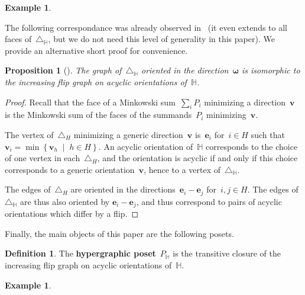 \documentclass[reqno]{amsart}
\newtheorem{proposition}[theorem]{Proposition}
\theoremstyle{definition}
\newtheorem{definition}[theorem]{Definition}
\newtheorem{example}[theorem]{Example}
\renewcommand{\b}[1]{\boldsymbol{#1}} %
\newcommand{\set}[2]{\left\{ #1 \;\middle|\; #2 \right\}} %
\newcommand{\simplex}{\triangle} %
\newcommand{\defn}[1]{\textbf{\textsf{\color{PineGreen} #1}}} %
\newcommand{\vincent}[1]{\todo[size=\tiny,color=blue!30]{ #1 \\ \hfill --- V.}\,}
\newcommand{\HH}{\mathbb H}  %
\begin{document}
\begin{example}
\vincent{todo}
\end{example}

The following correspondance was already observed in~\cite[Thm.~2.18]{BenedettiBergeronMachacek} (it even extends to all faces of~$\simplex_\HH$, but we do not need this level of generality in this paper).
We provide an alternative short proof for convenience.

\begin{proposition}[{\cite[Thm.~2.18]{BenedettiBergeronMachacek}}]
\label{prop:Hgraph}
The graph of~$\simplex_\HH$ oriented in the direction~$\b{\omega}$ is isomorphic to the increasing flip graph on acyclic orientations of~$\HH$.
\end{proposition}

\begin{proof}
Recall that the face of a Minkowski sum~$\sum_i P_i$ minimizing a direction~$\b{v}$ is the Minkowski sum of the faces of the summands~$P_i$ minimizing~$\b{v}$.

The vertex of~$\simplex_H$ minimizing a generic direction~$\b{v}$ is~$\b{e}_i$ for~$i \in H$ such that~$\b{v}_i = \min\set{\b{v}_h}{h \in H}$.
An acyclic orientation of~$\HH$ corresponds to the choice of one vertex in each~$\simplex_H$, and the orientation is acyclic if and only if this choice corresponds to a generic orientation~$\b{v}$, hence to a vertex of~$\simplex_\HH$.

The edges of~$\simplex_H$ are oriented in the directions~$\b{e}_i-\b{e}_j$ for~$i,j \in H$.
The edges of~$\simplex_\HH$ are thus also oriented by $\b{e}_i-\b{e}_j$, and thus correspond to pairs of acyclic orientations which differ by a flip.
\end{proof}

Finally, the main objects of this paper are the following posets.

\begin{definition}
The \defn{hypergraphic poset}~$P_\HH$ is the transitive closure of the increasing flip graph on acyclic orientations of~$\HH$.
\end{definition}

\begin{example}
\vincent{todo}
\end{example}
\end{document}
